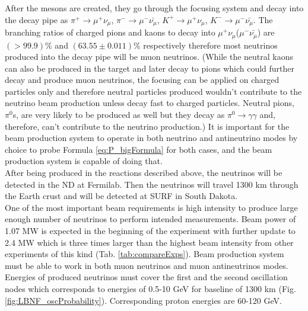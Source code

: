 After the mesons are created, they go through the focusing system and decay into the decay pipe as $\pi^+ \rightarrow \mu^+\nu_\mu$, $\pi^- \rightarrow \mu^-\bar{\nu_\mu}$, $K^+ \rightarrow \mu^+\nu_\mu$, $K^- \rightarrow \mu^-\bar{\nu_\mu}$. The branching ratios of charged pions and kaons to decay into $\mu^+\nu_\mu$($\mu^-\bar{\nu_\mu}$) are $(>99.9)\%$ and $(63.55\pm0.011)\%$ respectively \cite{ref_PDG} therefore most neutrinos produced into the decay pipe will be muon neutrinos. (While the neutral kaons can also be produced in the target and later decay to pions which could further decay and produce muon neutrinos, the focusing can be applied on charged particles only and therefore neutral particles produced wouldn't contribute to the neutrino beam production unless decay fast to charged particles. Neutral pions, $\pi^0$s, are very likely to be produced as well but they decay as $\pi^0 \rightarrow \gamma\gamma$ and, therefore, can't contribute to the neutrino production.) It is important for the beam production system to operate in both neutrino and antineutrino modes by choice to probe Formula \ref{eq:P_bigFormula} for both cases, and the beam production system is capable of doing that.\\
After being produced in the reactions described above, the neutrinos will be detected in the ND at Fermilab. Then the neutrinos will travel 1300 km through the Earth crust and will be detected at SURF in South Dakota.\\  

One of the most important beam requirements is high intensity to produce large enough number of neutrinos to perform intended measurements. Beam power of 1.07 MW is expected in the beginning of the experiment with further update to 2.4 MW which is three times larger than the highest beam intensity from other experiments of this kind (Tab. \ref{tab:compareExps}). Beam production system must be able to work in both muon neutrinos and muon antineutrinos modes. Energies of produced neutrinos must cover the first and the second oscillation nodes which corresponds to energies of 0.5-10 GeV for baseline of 1300 km (Fig. \ref{fig:LBNF_oscProbability}). Corresponding proton energies are 60-120 GeV.

